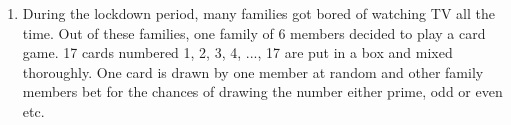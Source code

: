 \documentclass{article}
\begin{document}
\begin{enumerate}

\item During the lockdown period, many families got bored of watching TV all the time. Out of these families, one family of 6 members decided to play a card game. 17 cards numbered 1, 2, 3, 4, ..., 17 are put in a box and mixed thoroughly. One card is drawn by one member at random and other family members bet for the chances of drawing the number either prime, odd or even etc. 
        


\end{enumerate}
\end{document}
